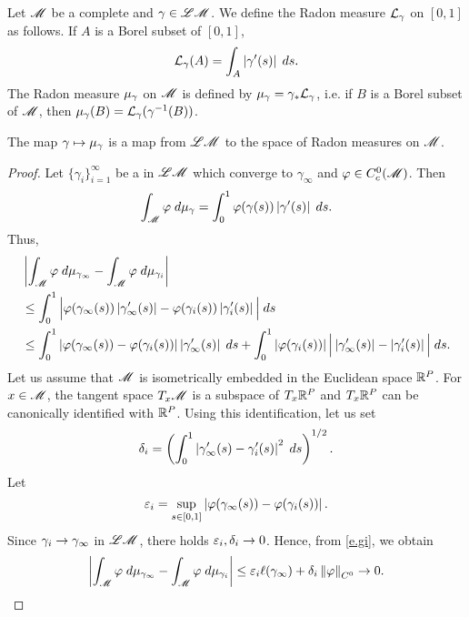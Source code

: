 \documentclass[11pt,twoside]{article}
\begin{document}
Let $\mathscr{M}$ be a complete \Rm \mf and \(\gamma\in \mathscr{L}\mathscr{M}\). We define the Radon measure \(\mathcal{L}_{\gamma}\) on \([0,1]\) as follows. If \(A\) is a Borel subset of \([0,1]\),
\[\mathcal{L}_{\gamma}(A)=\int_A\left|\gamma'(s)\right|\;ds.\]
The Radon measure \(\mu_{\gamma}\) on \(\mathscr{M}\) is defined by \(\mu_{\gamma}=\gamma_{*}\mathcal{L}_{\gamma}\), i.e. if \(B\) is a Borel subset of \(\mathscr{M}\), then \(\mu_{\gamma}(B)=\mathcal{L}_{\gamma}(\gamma^{-1}(B))\).

\begin{lem}\label{l.mu.ga}
The map \(\gamma\mapsto \mu_{\gamma}\) is a \cts map from \(\mathscr{L}\mathscr{M}\) to the space of Radon measures on \(\mathscr{M}\).
\end{lem}
\begin{proof}\newcommand{\gi}{\gamma_i}\newcommand{\gin}{\gamma_{\infty}}
Let \(\{\gi\}_{i=1}^{\infty}\) be a \seq in \(\mathscr{L}\mathscr{M}\) which converge to \(\gin\) and \(\varphi\in C^0_c(\mathscr{M})\). Then
\[\int_{\mathscr{M}} \varphi \; d\mu_{\gamma}=\int_{0}^{1}\varphi(\gamma(s))\left|\gamma'(s)\right|\;ds.\]
Thus,
\begin{align}
&\md{\int_{\sM} \vp \; d\mu_{\gin}-\int_{\sM} \vp \; d\mu_{\gi}}\\
&\leq \int_{0}^{1}\Big|\vp(\gin(s))\md{\gin'(s)}-\vp(\gi(s))\md{\gi'(s)}\Big|\;ds\\
&\leq \int_{0}^{1}\md{\vp(\gin(s))-\vp(\gi(s))}\md{\gin'(s)}\;ds + \int_{0}^{1}\md{\vp(\gi(s))}\Big|\md{\gin'(s)}-\md{\gi'(s)}\Big|\;ds.\label{e.gi}
\end{align}
Let us assume that \(\mathscr{M}\) is isometrically embedded in the Euclidean space $\mathbb{R}^P$. For \(x\in \mathscr{M}\), the tangent space \(T_x\mathscr{M}\) is a subspace of \(T_x\mathbb{R}^P\) and \(T_x\mathbb{R}^P\) can be canonically identified with \(\mathbb{R}^P\). Using this identification, let us set
\[\de_i=\left(\int_{0}^{1}\md{\gin'(s)-\gi'(s)}^2\;ds\right)^{1/2}.\]
Let
\[\ve_i=\sup_{s\in [0,1]} \md{\vp(\gin(s))-\vp(\gi(s))}.\]
Since \(\ga_i\ra \gin\) in \(\mathscr{L}\mathscr{M}\), there holds \(\varepsilon_i,\delta_i\rightarrow 0\). Hence, from \eqref{e.gi}, we obtain
\[\md{\int_{\sM} \vp \; d\mu_{\gin}-\int_{\sM} \vp \; d\mu_{\gi}}\leq \ve_i\ell(\gin)+\de_i\nm{\vp}_{C^0}\ra 0.\]
\end{proof}
\end{document}
